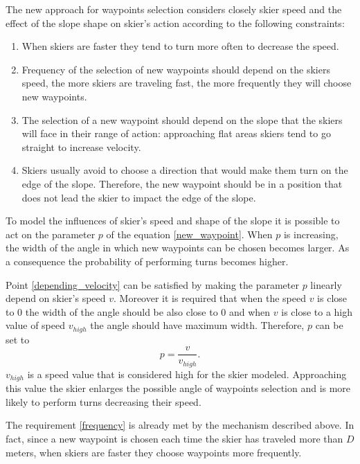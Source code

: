 \documentclass[12pt,a4paper,twoside]{book}
\begin{document}
The new approach for waypoints selection considers closely skier speed and the effect of the slope shape on skier's action according to the following constraints:\begin{enumerate}
\item \label{depending_velocity} When skiers are faster they tend to turn more often to decrease the speed.
\item \label{frequency} Frequency of the selection of new waypoints should depend on the skiers speed, the more skiers are traveling fast, the more frequently they will choose new waypoints.
\item \label{depending_slope} The selection of a new waypoint should depend on the slope that the skiers will face in their range of action: approaching flat areas skiers tend to go straight to increase velocity.
\item \label{avoid_impact} Skiers usually avoid to choose a direction that would make them turn on the edge of the slope. Therefore, the new waypoint should be in a position that does not lead the skier to impact the edge of the slope.
\end{enumerate}

To model the influences of skier's speed and shape of the slope it is possible to act on the parameter $p$ of the equation \ref{new_waypoint}. When $p$ is increasing, the width of the angle in which new waypoints can be chosen becomes larger. As a consequence the probability of performing turns becomes higher.

Point \ref{depending_velocity} can be satisfied by making the parameter $p$ linearly depend on skier's speed $v$. Moreover it is required that when the speed $v$ is close to $0$ the width of the angle should be also close to $0$ and when $v$ is close to a high value of speed $v_{high}$ the angle should have maximum width. Therefore, $p$ can be set to
\begin{equation}\label{delta_vel}
p= \frac{v}{v_{high}}.
\end{equation}
$v_{high}$ is a speed value that is considered high for the skier modeled. Approaching this value the skier enlarges the possible angle of waypoints selection and is more likely to perform turns decreasing their speed.

The requirement \ref{frequency} is already met by the mechanism described above. In fact, since a new waypoint is chosen each time the skier has traveled more than $D$ meters, when skiers are faster they choose waypoints more frequently.
\end{document}
